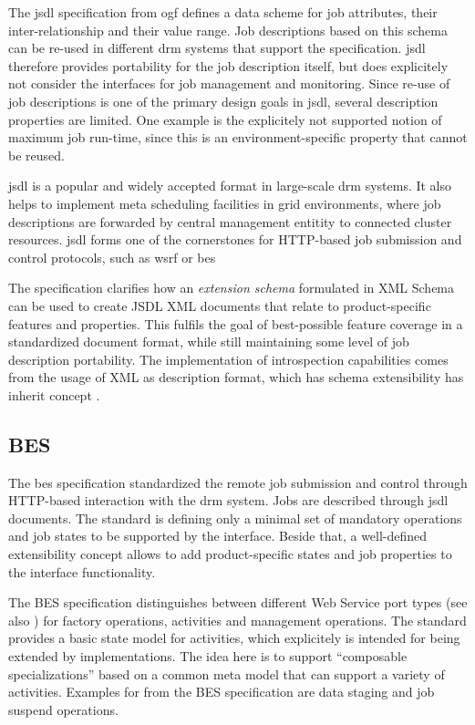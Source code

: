 \documentclass[twocolumn]{svjour3}       %
\begin{document}
The \gls{jsdl} specification from \gls{ogf} defines a data scheme for job attributes, their inter-relationship and their value range. Job descriptions based on this schema can be re-used in different \gls{drm} systems that support the specification. \gls{jsdl} therefore provides portability for the job description itself, but does explicitely not consider the interfaces for job management and monitoring. Since re-use of job descriptions is one of the primary design goals in \gls{jsdl}, several description properties are limited. One example is the explicitely not supported notion of maximum job run-time, since this is an environment-specific property that cannot be reused.

\gls{jsdl} is a popular and widely accepted format in large-scale \gls{drm} systems. It also helps to implement meta scheduling facilities in grid environments, where job descriptions are forwarded by central management entitity to connected cluster resources. \gls{jsdl} forms one of the cornerstones for HTTP-based job submission and control protocols, such as \gls{wsrf} or \gls{bes}

The specification clarifies how an \emph{extension schema} formulated in XML Schema can be used to create JSDL XML documents that relate to product-specific features and properties. This fulfils the goal of best-possible feature coverage in a standardized document format, while still maintaining some level of job description portability. The implementation of introspection capabilities comes from the usage of XML as description format, which has schema extensibility has inherit concept \cite{xmlschema}. 

\subsection{BES}

The \gls{bes} specification \cite{gfd.108} standardized the remote job submission and control through HTTP-based interaction with the \gls{drm} system. Jobs are described through \gls{jsdl} documents. The standard is defining only a minimal set of mandatory operations and job states to be supported by the interface. Beside that, a well-defined extensibility concept allows to add product-specific states and job properties to the interface functionality. 

The BES specification distinguishes between different Web Service port types (see also \cite{citemaster_579}) for factory operations, activities and management operations. The standard provides a basic state model for activities, which explicitely is intended for being extended by implementations. The idea here is to support ``composable specializations'' based on a common meta model that can support a variety of activities. Examples for from the BES specification are data staging and job suspend operations.
\end{document}

